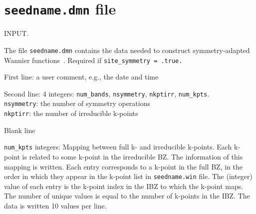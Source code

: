 %


\section{{\tt seedname.dmn} file} 

INPUT. 

The file \verb#seedname.dmn# contains the data needed to construct symmetry-adapted Wannier functions~\cite{sakuma-prb13}. 
Required if \verb#site_symmetry = .true.#

First line: a user comment, e.g., the date and time

Second line: 4 integers: \verb#num_bands#, \verb#nsymmetry#, \verb#nkptirr#, \verb#num_kpts#.  \\ 
\phantom{Second line:} \verb#nsymmetry#: the number of symmetry operations   \\
\phantom{Second line:}  \verb#nkptirr#: the number of irreducible k-points

Blank line 

\verb#num_kpts# integers: 
Mapping between full k- and irreducible k-points. 
Each k-point is related to some k-point in the irreducible BZ. 
The information of this mapping is written. Each entry corresponds to a k-point in the 
full BZ, in the order in which they appear in the k-point list in \verb#seedname.win# file.
The (integer) value of each entry is the k-point index in the IBZ to which the k-point maps. 
The number of unique values is equal to the number of k-points in the IBZ.
The data is written 10 values per line. 
 
